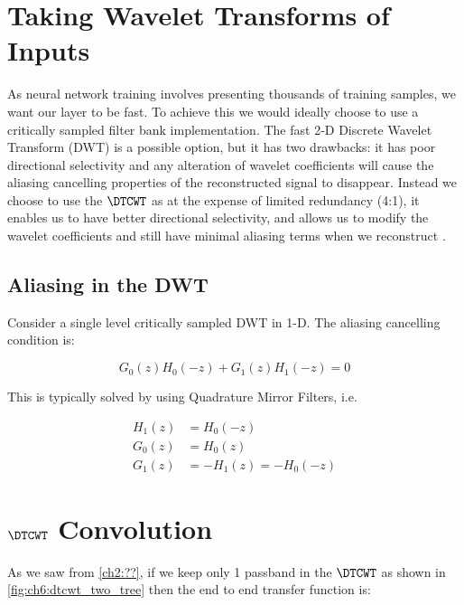\section{Taking Wavelet Transforms of Inputs}\label{sec:ch6:gainlayer}

As neural network training involves presenting thousands of training samples, we
want our layer to be fast. To achieve this we would ideally choose to use a
critically sampled filter bank implementation. The fast 2-D Discrete Wavelet
Transform (DWT) is a possible option, but it has two drawbacks: it has poor
directional selectivity and any alteration of wavelet coefficients will cause
the aliasing cancelling properties of the reconstructed signal to disappear.
Instead we choose to use the $\DTCWT$ \cite{selesnick_dual-tree_2005} as at the
expense of limited redundancy (4:1), it enables us to have better directional
selectivity, and allows us to modify the wavelet coefficients and still have
minimal aliasing terms when we reconstruct \cite{kingsbury_complex_2001}.

\subsection{Aliasing in the DWT}
Consider a single level critically sampled DWT in 1-D. The aliasing cancelling
condition is:

$$G_0(z)H_0(-z) + G_1(z)H_1(-z) = 0$$

This is typically solved by using Quadrature Mirror Filters, i.e.

\begin{align}
  H_1(z) &= H_0(-z) \\
  G_0(z) &= H_0(z) \\
  G_1(z) &= -H_1(z) = -H_0(-z) 
\end{align}

\section{$\DTCWT$ Convolution}

\begin{figure}
  \centering
  
  \label{fig:ch6:dtcwt_two_tree}
\end{figure}

As we saw from \autoref{ch2:??}, if we keep only 1 passband in the $\DTCWT$ as
shown in \autoref{fig:ch6:dtcwt_two_tree} then
the end to end transfer function is:

